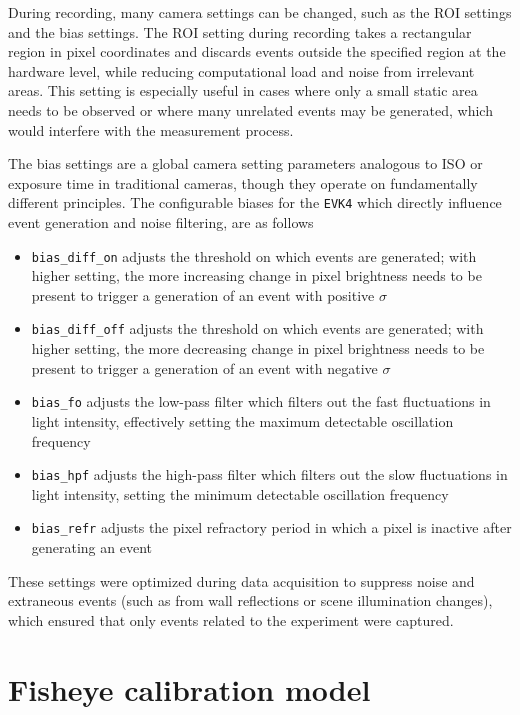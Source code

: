During recording, many camera settings can be changed, such as the \ac{ROI} settings and the bias settings.
The \ac{ROI} setting during recording takes a rectangular region in pixel coordinates and discards events outside the specified region at the hardware level, while reducing computational load and noise from irrelevant areas. This setting is especially useful in cases where only a small static area needs to be observed or where many unrelated events
may be generated, which would interfere with the measurement process.

The bias settings are a global camera setting parameters analogous to ISO or exposure time in traditional cameras, though they operate on fundamentally
different principles.
The configurable biases for the \texttt{EVK4} which directly influence event generation and noise filtering, are as follows~\cite{dilmaghani2022controlevaluationeventcameras}
\begin{itemize}
    \item \texttt{bias\_diff\_on} adjusts the threshold on which events are generated; with higher setting, the more increasing change in pixel brightness needs to be present to trigger a generation of an event with positive $\sigma$
    \item \texttt{bias\_diff\_off} adjusts the threshold on which events are generated; with higher setting, the more decreasing change in pixel brightness needs to be present to trigger a generation of an event with negative $\sigma$
    \item \texttt{bias\_fo} adjusts the low-pass filter which filters out the fast fluctuations in light intensity, effectively setting the maximum detectable oscillation frequency
    \item \texttt{bias\_hpf} adjusts the high-pass filter which filters out the slow fluctuations in light intensity, setting the minimum detectable oscillation frequency
    \item \texttt{bias\_refr} adjusts the pixel refractory period in which a pixel is inactive after generating an event
\end{itemize}
These settings were optimized during data acquisition to suppress noise and extraneous events (such as from wall reflections or scene illumination changes), which
ensured that only events related to the experiment were captured.


\section{Fisheye calibration model}


